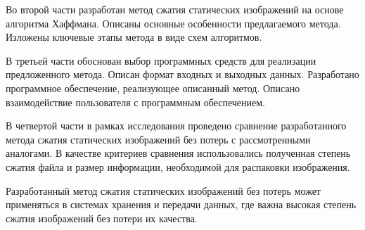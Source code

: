 Во второй части разработан метод сжатия статических изображений на основе алгоритма Хаффмана. Описаны основные особенности предлагаемого метода. Изложены ключевые этапы метода в виде схем алгоритмов.

В третьей части обоснован выбор программных средств для реализации предложенного метода. Описан формат входных и выходных данных. Разработано программное обеспечение, реализующее описанный метод. Описано взаимодействие пользователя с программным обеспечением.

В четвертой части в рамках исследования проведено сравнение разработанного метода сжатия статических изображений без потерь с рассмотренными аналогами. В качестве критериев сравнения использовались полученная степень сжатия файла и размер информации, необходимой для распаковки изображения.

Разработанный метод сжатия статических изображений без потерь может применяться в системах хранения и передачи данных, где важна высокая степень сжатия изображений без потери их качества.
